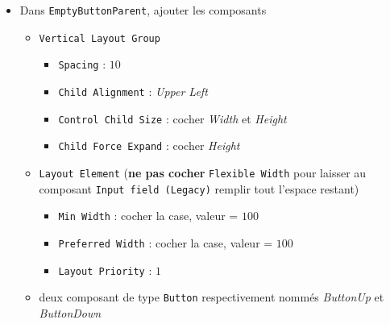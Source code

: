 \documentclass[a4paper,10pt]{article}
\newenvironment{solution}%
{\begin{tcolorbox}[breakable,colback=red!5!white,colframe=red!75!black,title=Solution]}%
{\end{tcolorbox}}
\begin{document}
\begin{solution}
\begin{itemize}
	 \item Dans \texttt{EmptyButtonParent}, 	ajouter les composants
		\begin{itemize}				
			\item	\texttt{Vertical Layout Group}
			\begin{itemize}
				\item \texttt{Spacing} : $10$
				\item \texttt{Child Alignment} : \textit{Upper Left}
				\item \texttt{Control Child Size} : cocher \textit{Width} et \textit{Height}
				\item \texttt{Child Force Expand} : cocher \textit{Height}
			\end{itemize}			
			\item \texttt{Layout Element} (\textbf{ne pas cocher} \texttt{Flexible Width} pour laisser au composant \texttt{Input field (Legacy)} remplir tout l'espace restant)
			\begin{itemize}
				\item \texttt{Min Width} : cocher la case, valeur = $100$
				\item \texttt{Preferred Width} : cocher la case, valeur = $100$
				\item \texttt{Layout Priority} : $1$
			\end{itemize}			
			\item deux composant de type \texttt{Button} respectivement nommés \textit{ButtonUp} et \textit{ButtonDown}
		\end{itemize}				
	

\end{itemize}
\end{solution}
\end{document}
